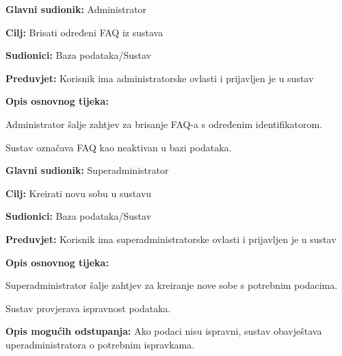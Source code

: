                 \noindent {}
					\begin{packed_item}
	
						\item \textbf{Glavni sudionik: }Administrator
						\item  \textbf{Cilj:} Brisati određeni FAQ iz sustava
						\item  \textbf{Sudionici:} Baza podataka/Sustav
						\item  \textbf{Preduvjet:} Korisnik ima administratorske ovlasti i prijavljen je u sustav
						\item  \textbf{Opis osnovnog tijeka:}
						
						\item[] \begin{packed_enum}
	
							\item Administrator šalje zahtjev za brisanje FAQ-a s određenim identifikatorom.
							\item Sustav označava FAQ kao neaktivan u bazi podataka.
	
						\end{packed_enum}

						
					\end{packed_item}

                \noindent {}
					\begin{packed_item}
	
						\item \textbf{Glavni sudionik: }Superadministrator
						\item  \textbf{Cilj:} Kreirati novu sobu u sustavu
						\item  \textbf{Sudionici:} Baza podataka/Sustav
						\item  \textbf{Preduvjet:} Korisnik ima superadministratorske ovlasti i prijavljen je u sustav
						\item  \textbf{Opis osnovnog tijeka:}
						
						\item[] \begin{packed_enum}
	
							\item Superadministrator šalje zahtjev za kreiranje nove sobe s potrebnim podacima.
							\item Sustav provjerava ispravnost podataka.
	
						\end{packed_enum}
						
						\item  \textbf{Opis mogućih odstupanja:} Ako podaci nisu ispravni, sustav obavještava uperadministratora o potrebnim ispravkama.
						
						
					\end{packed_item}

